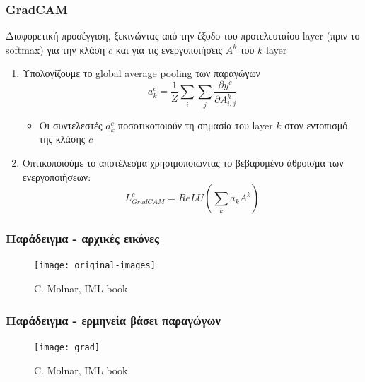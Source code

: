 \begin{frame}
  \frametitle{GradCAM}
  Διαφορετική προσέγγιση, ξεκινώντας από την έξοδο του προτελευταίου layer
  (πριν το softmax) για την κλάση $c$ και για τις ενεργοποιήσεις $A^{k}$ του
  $k$ layer
  \begin{enumerate}
  \item Υπολογίζουμε το global average pooling των παραγώγων
    \begin{equation*}
      a_{k}^{c} = \frac{1}{Z}\sum\limits_i\sum\limits_j\frac{\partial
        y^{c}}{\partial A^{k}_{i, j}}
    \end{equation*}
    \begin{itemize}
    \item Οι συντελεστές $a_{k}^{c}$ ποσοτικοποιούν τη σημασία του layer $k$ στον
      εντοπισμό της κλάσης $c$
    \end{itemize}
  \item Οπτικοποιούμε το αποτέλεσμα χρησιμοποιώντας το βεβαρυμένο άθροισμα
    των ενεργοποιήσεων:
    \begin{equation*}
      L_{GradCAM}^{c} = ReLU\left(\sum\limits_ka_kA^{k}\right)
    \end{equation*}
  \end{enumerate}
\end{frame}

\begin{frame}
  \frametitle{Παράδειγμα - αρχικές εικόνες}
  \begin{figure}
    \texttt{[image: original-images]}
    \caption{\footnotesize C. Molnar, IML book}
  \end{figure}

\end{frame}

\begin{frame}
  \frametitle{Παράδειγμα - ερμηνεία βάσει παραγώγων}
  \begin{figure}
    \texttt{[image: grad]}
    \caption{\footnotesize C. Molnar, IML book}
  \end{figure}
\end{frame}

